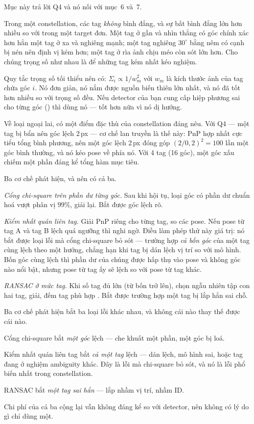 \documentclass[../../marker.tex]{subfiles}
\begin{document}
Mục này trả lời Q4 và nó nối với  mục~6 và~7.

Trong một constellation, các tag \emph{không} bình đẳng, và sự bất bình đẳng lớn hơn nhiều so với trong một target đơn. Một tag ở gần và nhìn thẳng có góc chính xác hơn hẳn một tag ở xa và nghiêng mạnh; một tag nghiêng \(30^\circ\) bằng nêm có cạnh bị nén nên định vị kém hơn; một tag ở rìa ảnh chịu méo còn sót lớn hơn. Cho chúng trọng số như nhau là để những tag kém nhất kéo nghiệm.

Quy tắc trọng số tối thiểu nên có: \(\Sigma_i \propto 1/w_m^2\) với \(w_m\) là kích thước ảnh của tag chứa góc \(i\). Nó đơn giản, nó nắm được nguồn biến thiên lớn nhất, và nó đã tốt hơn nhiều so với trọng số đều. Nếu detector của bạn cung cấp hiệp phương sai cho từng góc () thì dùng nó --- tốt hơn nữa vì nó dị hướng.

Về loại ngoại lai, có một điểm đặc thù của constellation đáng nêu. Với Q4 --- một tag bị bẩn nên góc lệch 2\,px --- cơ chế lan truyền là thế này: PnP hợp nhất cực tiểu tổng bình phương, nên một góc lệch 2\,px đóng góp \((2/0{,}2)^2 = 100\) lần một góc bình thường, và nó kéo pose về phía nó. Với 4 tag (16 góc), một góc xấu chiếm một phần đáng kể tổng hàm mục tiêu.

Ba cơ chế phát hiện, và nên có cả ba.

\emph{Cổng chi-square trên phần dư từng góc.} Sau khi hội tụ, loại góc có phần dư chuẩn hoá vượt phân vị 99\%, giải lại. Bắt được góc lệch rõ.

\emph{Kiểm nhất quán liên tag.} Giải PnP riêng cho từng tag, so các pose. Nếu pose từ tag A và tag B lệch quá ngưỡng thì nghi ngờ. Điều làm phép thử này giá trị: nó bắt được loại lỗi mà cổng chi-square bỏ sót --- trường hợp \emph{cả bốn góc} của một tag cùng lệch theo một hướng, chẳng hạn khi tag bị dán lệch vị trí so với mô hình. Bốn góc cùng lệch thì phần dư của chúng được hấp thụ vào pose và không góc nào nổi bật, nhưng pose từ tag ấy sẽ lệch so với pose từ tag khác.

\emph{RANSAC ở mức tag.} Khi số tag đủ lớn (từ bốn trở lên), chọn ngẫu nhiên tập con hai tag, giải, đếm tag phù hợp \cite{fischler1981ransac}. Bắt được trường hợp một tag bị lắp hẳn sai chỗ.

\begin{cannho}
Ba cơ chế phát hiện bắt ba loại lỗi khác nhau, và không cái nào thay thế được cái nào.

Cổng chi-square bắt \emph{một góc} lệch --- che khuất một phần, một góc bị loá.

Kiểm nhất quán liên tag bắt \emph{cả một tag} lệch --- dán lệch, mô hình sai, hoặc tag đang ở nghiệm ambiguity khác. Đây là lỗi mà chi-square bỏ sót, và nó là lỗi phổ biến nhất trong constellation.

RANSAC bắt \emph{một tag sai hẳn} --- lắp nhầm vị trí, nhầm ID.

Chi phí của cả ba cộng lại vẫn không đáng kể so với detector, nên không có lý do gì chỉ dùng một.
\end{cannho}
\end{document}
